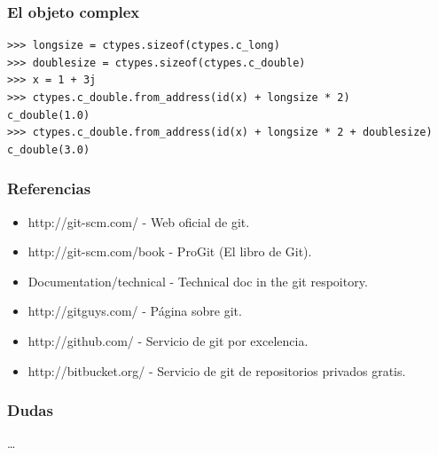 \documentclass[10pt]{beamer}
\begin{document}
  \begin{frame}[containsverbatim]
    \frametitle{El objeto complex}
    \begin{verbatim}
>>> longsize = ctypes.sizeof(ctypes.c_long)
>>> doublesize = ctypes.sizeof(ctypes.c_double)
>>> x = 1 + 3j
>>> ctypes.c_double.from_address(id(x) + longsize * 2)
c_double(1.0)
>>> ctypes.c_double.from_address(id(x) + longsize * 2 + doublesize)
c_double(3.0)
    \end{verbatim}
  \end{frame}

  \begin{frame}[containsverbatim]
    \frametitle{Referencias}
    \begin{itemize}
      \item \small{http://git-scm.com/ - Web oficial de git.}
      \item \small{http://git-scm.com/book - ProGit (El libro de Git).}
      \item \small{Documentation/technical - Technical doc in the git respoitory. }
      \item \small{http://gitguys.com/ - Página sobre git.}
      \item \small{http://github.com/ - Servicio de git por excelencia.}
      \item \small{http://bitbucket.org/ - Servicio de git de repositorios privados gratis.}
    \end{itemize}
  \end{frame}

  \begin{frame}[containsverbatim]
    \frametitle{Dudas}
    \dots
  \end{frame}
\end{document}
